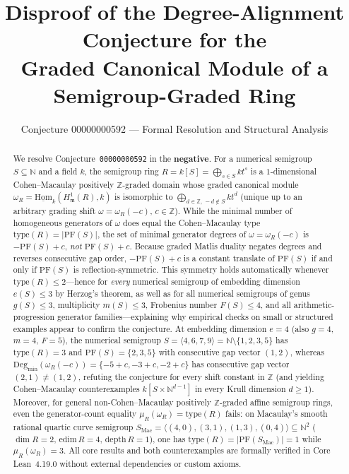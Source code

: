 \documentclass[11pt]{article}
\title{\textbf{Disproof of the Degree-Alignment Conjecture for the\\Graded Canonical Module of a Semigroup-Graded Ring}}
\author{Conjecture 00000000592 --- Formal Resolution and Structural Analysis}
\date{}
\theoremstyle{definition}
\theoremstyle{remark}
\begin{document}
\maketitle

\begin{abstract}
We resolve Conjecture~\texttt{00000000592} in the \textbf{negative}. For a numerical semigroup $S \subseteq \mathbb{N}$ and a field $k$, the semigroup ring $R = k[S] = \bigoplus_{s \in S} k t^s$ is a $1$-dimensional Cohen--Macaulay positively $\mathbb{Z}$-graded domain whose graded canonical module $\omega_R = \underline{\mathrm{Hom}}_k(H^1_{\mathfrak{m}}(R), k)$ is isomorphic to $\bigoplus_{d \in \mathbb{Z},\, -d \notin S} k t^d$ (unique up to an arbitrary grading shift $\omega = \omega_R(-c)$, $c \in \mathbb{Z}$). While the minimal number of homogeneous generators of $\omega$ does equal the Cohen--Macaulay type $\mathrm{type}(R) = |\mathrm{PF}(S)|$, the set of minimal generator degrees of $\omega = \omega_R(-c)$ is $-\mathrm{PF}(S) + c$, \emph{not} $\mathrm{PF}(S) + c$. Because graded Matlis duality negates degrees and reverses consecutive gap order, $-\mathrm{PF}(S) + c$ is a constant translate of $\mathrm{PF}(S)$ if and only if $\mathrm{PF}(S)$ is reflection-symmetric. This symmetry holds automatically whenever $\mathrm{type}(R) \le 2$---hence for \emph{every} numerical semigroup of embedding dimension $e(S) \le 3$ by Herzog's theorem, as well as for all numerical semigroups of genus $g(S) \le 3$, multiplicity $m(S) \le 3$, Frobenius number $F(S) \le 4$, and all arithmetic-progression generator families---explaining why empirical checks on small or structured examples appear to confirm the conjecture. At embedding dimension $e = 4$ (also $g = 4$, $m = 4$, $F = 5$), the numerical semigroup $S = \langle 4, 6, 7, 9 \rangle = \mathbb{N} \setminus \{1, 2, 3, 5\}$ has $\mathrm{type}(R) = 3$ and $\mathrm{PF}(S) = \{2, 3, 5\}$ with consecutive gap vector $(1, 2)$, whereas $\mathrm{Deg}_{\min}(\omega_R(-c)) = \{-5 + c, -3 + c, -2 + c\}$ has consecutive gap vector $(2, 1) \ne (1, 2)$, refuting the conjecture for every shift constant in $\mathbb{Z}$ (and yielding Cohen--Macaulay counterexamples $k[S \times \mathbb{N}^{d-1}]$ in every Krull dimension $d \ge 1$). Moreover, for general non-Cohen--Macaulay positively $\mathbb{Z}$-graded affine semigroup rings, even the generator-count equality $\mu_R(\omega_R) = \mathrm{type}(R)$ fails: on Macaulay's smooth rational quartic curve semigroup $S_{\mathrm{Mac}} = \langle (4,0), (3,1), (1,3), (0,4) \rangle \subseteq \mathbb{N}^2$ ($\dim R = 2$, $\mathrm{edim}\, R = 4$, $\mathrm{depth}\, R = 1$), one has $\mathrm{type}(R) = |\mathrm{PF}(S_{\mathrm{Mac}})| = 1$ while $\mu_R(\omega_R) = 3$. All core results and both counterexamples are formally verified in Core Lean~4.19.0 without external dependencies or custom axioms.
\end{abstract}
\end{document}

